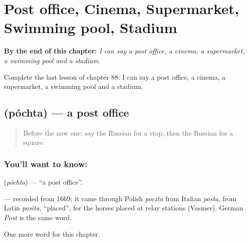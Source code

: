 
\chapter{Post office, Cinema, Supermarket, Swimming pool, Stadium}
\label{ch:ru-post-office-cinema-supermarket-swimming-pool-stadium}

\begin{chapteropening}
\textbf{By the end of this chapter:} \emph{I can say a post office, a cinema, a supermarket, a swimming pool and a stadium.}

Complete the last lesson of chapter 88: I can say a post office, a cinema, a supermarket, a swimming pool and a stadium.
\end{chapteropening}

\section[\texorpdfstring{\ru{почта} (póchta)}{почта (póchta)}]{ (póchta) — a post office}

\label{lesson:RU-C88-post-office}



\begin{quote}
Before the new one: say the Russian for a stop, then the Russian for a square.
\end{quote}

\subsection*{You'll want to know: }
\textbf{} (\emph{póchta}) — \textquotedblleft{}a post office\textquotedblright{}.

\begin{cousinweb}
\textbf{} — recorded from 1669; it came through Polish \emph{poczta} from Italian \emph{posta}, from Latin \emph{posita}, \textquotedblleft{}placed\textquotedblright{}, for the horses placed at relay stations (Vasmer). German \emph{Post} is the same word.
\end{cousinweb}

\begin{grammarlens}[title={What you've built}]
One more word for this chapter.
\end{grammarlens}


